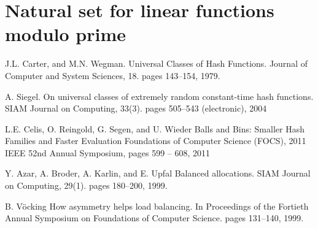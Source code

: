 \documentclass{article}
\begin{document}
\section{Natural set for linear functions modulo prime}



\begin{thebibliography}{32}
J.L. Carter, and M.N. Wegman. 
\newblock Universal Classes of Hash Functions.
\newblock Journal of Computer and System Sciences, 18. pages 143--154, 1979.

A. Siegel. 
\newblock On universal classes of extremely random constant-time hash functions.
\newblock SIAM Journal on Computing, 33(3). pages 505--543 (electronic), 2004

L.E. Celis, O. Reingold, G. Segen, and U. Wieder
\newblock Balls and Bins: Smaller Hash Families and Faster Evaluation
\newblock Foundations of Computer Science (FOCS), 2011 IEEE 52nd Annual Symposium, pages 599 -- 608, 2011

Y. Azar, A. Broder, A. Karlin, and E. Upfal
\newblock Balanced allocations.
\newblock SIAM Journal on Computing, 29(1). pages 180--200, 1999.

B. V\"{o}cking
\newblock How asymmetry helps load balancing.
\newblock In Proceedings of the Fortieth Annual Symposium on Foundations of Computer Science. pages 131--140, 1999.
\end{thebibliography}
\end{document}
